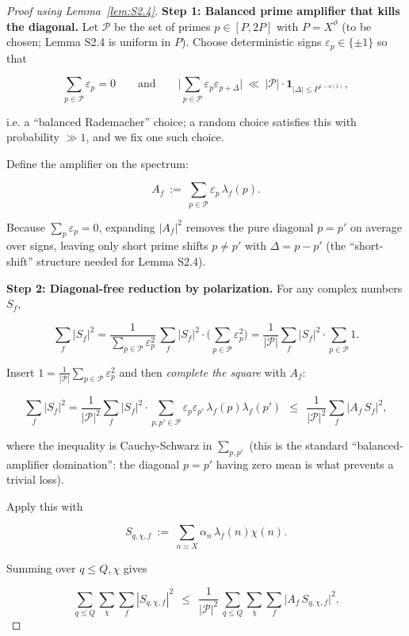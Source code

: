 \documentclass[11pt]{article}
\theoremstyle{definition}
\theoremstyle{remark}
\numberwithin{equation}{part}
\begin{document}
\begin{proof}[Proof using Lemma~\ref{lem:S2.4}]

	\noindent\textbf{Step 1: Balanced prime amplifier that kills the diagonal.}
	Let $\mathcal P$ be the set of primes $p\in[P,2P]$ with $P=X^\vartheta$ (to be chosen; Lemma S2.4 is uniform in $P$).
	Choose deterministic signs $\varepsilon_p\in\{\pm 1\}$ so that

	$$
		\sum_{p\in\mathcal P}\varepsilon_p=0
		\qquad\text{and}\qquad
		\Big|\sum_{p\in\mathcal P}\varepsilon_p\varepsilon_{p+\Delta}\Big|\ \ll\ |\mathcal P|\cdot \mathbf{1}_{|\Delta|\le P^{1-o(1)}},
	$$

	i.e. a “balanced Rademacher” choice; a random choice satisfies this with probability $\gg 1$, and we fix one such choice.

	Define the amplifier on the spectrum:

	$$
		A_f \ :=\ \sum_{p\in\mathcal P}\varepsilon_p\,\lambda_f(p).
	$$

	Because $\sum_p\varepsilon_p=0$, expanding $|A_f|^2$ removes the pure diagonal $p=p'$ on average over signs, leaving only short prime shifts $p\neq p'$ with $\Delta = p-p'$ (the “short-shift” structure needed for Lemma S2.4).

	\noindent\textbf{Step 2: Diagonal-free reduction by polarization.}
	For any complex numbers $S_f$,

	$$
		\sum_f |S_f|^2
		=\frac{1}{\sum_{p\in\mathcal P}\varepsilon_p^2}\,
		\sum_f |S_f|^2\cdot \Big(\sum_{p\in\mathcal P}\varepsilon_p^2\Big)
		=\frac{1}{|\mathcal P|}\sum_f |S_f|^2\cdot \sum_{p\in\mathcal P}1.
	$$

	Insert $1=\frac{1}{|\mathcal P|}\sum_{p\in\mathcal P}\varepsilon_p^2$ and then \emph{complete the square} with $A_f$:

	$$
		\sum_f |S_f|^2
		=\frac{1}{|\mathcal P|^2}\sum_f |S_f|^2\cdot \sum_{p,p'\in\mathcal P}\varepsilon_p\varepsilon_{p'}\,\lambda_f(p)\lambda_f(p')
		\ \ \le\ \ \frac{1}{|\mathcal P|^2}\sum_f |A_f\,S_f|^2,
	$$

	where the inequality is Cauchy-Schwarz in $\sum_{p,p'}$ (this is the standard “balanced-amplifier domination”: the diagonal $p=p'$ having zero mean is what prevents a trivial loss).

	Apply this with

	$$
		S_{q,\chi,f}\ :=\ \sum_{n\asymp X}\alpha_n\,\lambda_f(n)\chi(n).
	$$

	Summing over $q\le Q,\chi$ gives

	\begin{equation}\label{eq:C31}
		\sum_{q\le Q}\sum_{\chi}\sum_f |S_{q,\chi,f}|^2
		\ \ \le\ \ \frac{1}{|\mathcal P|^2}\,
		\sum_{q\le Q}\sum_{\chi}\sum_f \big|A_f\,S_{q,\chi,f}\big|^2.
	\end{equation}


\end{proof}
\end{document}
